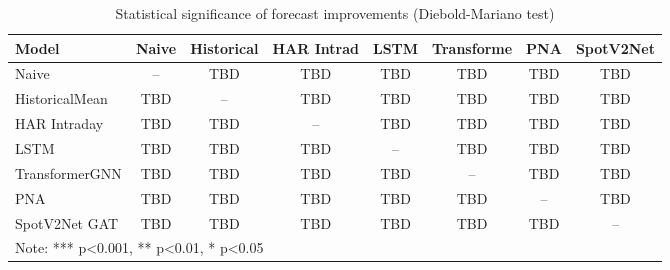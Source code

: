 \documentclass[journal]{IEEEtran}
\begin{document}
\begin{table}[!t]
\centering
\caption{Statistical significance of forecast improvements (Diebold-Mariano test)}
\label{tab:statistical_tests}
\begin{tabular}{lccccccc}
\toprule
Model & Naive & Historical & HAR Intrad & LSTM & Transforme & PNA & SpotV2Net  \\
\midrule
Naive & -- & TBD & TBD & TBD & TBD & TBD & TBD \\
HistoricalMean & TBD & -- & TBD & TBD & TBD & TBD & TBD \\
HAR Intraday & TBD & TBD & -- & TBD & TBD & TBD & TBD \\
LSTM & TBD & TBD & TBD & -- & TBD & TBD & TBD \\
TransformerGNN & TBD & TBD & TBD & TBD & -- & TBD & TBD \\
PNA & TBD & TBD & TBD & TBD & TBD & -- & TBD \\
SpotV2Net GAT & TBD & TBD & TBD & TBD & TBD & TBD & -- \\
\bottomrule
\multicolumn{8}{l}{\footnotesize Note: *** p<0.001, ** p<0.01, * p<0.05}
\end{tabular}
\end{table}
\end{document}

